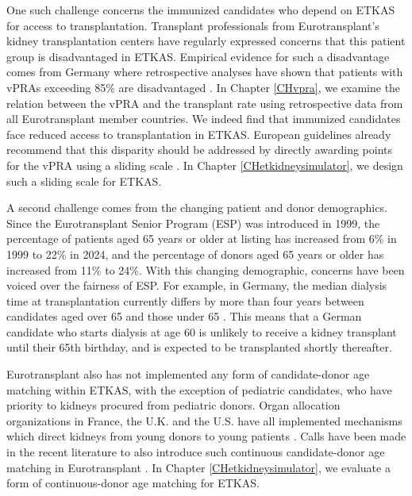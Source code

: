 \documentclass[11pt,twoside,]{book}
\begin{document}
One such challenge concerns the immunized candidates who depend on ETKAS for
access to transplantation. Transplant professionals from Eurotransplant's kidney transplantation
centers have regularly expressed concerns that this patient group is disadvantaged
in ETKAS. Empirical evidence for such a disadvantage comes from Germany where retrospective analyses have
shown that patients with vPRAs exceeding 85\% are disadvantaged
\citep{ziemannUnacceptableHumanLeucocyte2017, zecherImpactSensitizationWaiting2022a}.
In Chapter \ref{CHvpra}, we examine the relation between the vPRA and the
transplant rate using retrospective data from all Eurotransplant member
countries. We indeed find that immunized candidates face reduced access to
transplantation in ETKAS. European guidelines already recommend that this disparity should be addressed
by directly awarding points for the vPRA using a sliding scale \citep{Mamode2022}.
In Chapter \ref{CHetkidneysimulator}, we design such a sliding scale for ETKAS.

A second challenge comes from the changing patient and donor demographics.
Since the Eurotransplant Senior Program (ESP) was introduced in 1999, the
percentage of patients aged 65 years or older at listing has increased from 6\%
in 1999 to 22\% in 2024, and the percentage of donors aged 65 years or older has increased
from 11\% to 24\%. With this changing demographic, concerns have been voiced over the fairness of
ESP. For example, in Germany, the median dialysis time at transplantation
currently differs by more than four years between candidates aged over 65 and
those under 65 \citep{Kolbrink2024}. This means that a German candidate who starts
dialysis at age 60 is unlikely to receive a kidney transplant until their 65th
birthday, and is expected to be transplanted shortly thereafter.

Eurotransplant also has not implemented any form of candidate-donor age matching
within ETKAS, with the exception of pediatric candidates, who have priority to
kidneys procured from pediatric donors. Organ allocation organizations in France,
the U.K. and the U.S. have all implemented mechanisms which direct kidneys from
young donors to young patients \citep{Audry2022, watson2020overview, israniNewNationalAllocation2014}.
Calls have been made in the recent literature to also introduce
such continuous candidate-donor age matching in Eurotransplant \citep{vonsamson-himmelstjernaContinuousDonorrecipientAge2024}.
In Chapter \ref{CHetkidneysimulator}, we evaluate a form of continuous-donor
age matching for ETKAS.
\end{document}
